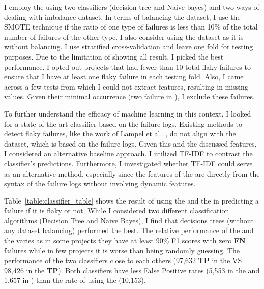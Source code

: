 I employ the \classifier using two classifiers (decision tree and Naive bayes) and two ways of dealing with imbalance dataset. In terms of balancing the dataset, I use the SMOTE technique if the ratio of one type of failures is less than 10$\%$ of the total number of failures of the other type. I also consider using the dataset as it is without balancing. I use stratified cross-validation and leave one fold for testing purposes. Due to the limitation of showing all result, I picked the best performance. 
I opted out projects that had fewer than 10 total flaky failures to ensure that I have at least one flaky failure in each testing fold. Also, I came across a few tests from which I could not extract features, resulting in missing values. Given their minimal occurrence (two failure in \wildfly), I exclude these failures. 


To further understand the efficacy of machine learning in this context, I looked for a state-of-the-art classifier based on the failure logs. Existing methods to detect flaky failures, like the work of Lampel et al.~\cite{lampel2021life}, do not align with the dataset, which is based on the failure logs. Given this and the discussed features, I considered an alternative baseline approach. I utilized TF-IDF to contrast the classifier's predictions. Furthermore, I investigated whether TF-IDF could serve as an alternative method, especially since the features of the \classifier are directly from the syntax of the failure logs without involving dynamic features.



Table~\ref{table:classifier_table} shows the result of using the \classifier and the \tfidf in predicting a failure if it is flaky or not.
While I considered two different classification algorithms (Decision Tree and Naive Bayes), I find that decisions trees (without any dataset balancing) performed the best.
The relative performance of the \classifier and the \tfidf varies as in some projects they have at least 90\% F1 scores with zero \textbf{FN} failures while in few projects it is worse than being randomly guessing. The performance of the two classifiers close to each others (97,632 \textbf{TP} in the \classifier VS 98,426 in the \tfidf \textbf{TP}). Both classifiers have less False Positive rates (5,553 in the \classifier and 1,657 in \tfidf) than the rate of using the \syntax (10,153). 


